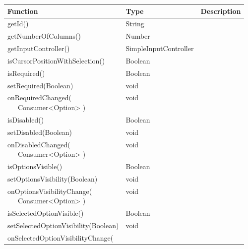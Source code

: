 \begin{table}[!htb] 
    \label{api:selectControllerReturn}
    \footnotesize
    \setlength\extrarowheight{4pt}
    \begin{tabular}{ p{5cm} p{3cm} p{5cm} }
        \toprule[1.2pt]
        \textbf{Function}                    & \textbf{Type}          & \textbf{Description} \\
        \midrule
        getId()                              & String                 &  \\
        getNumberOfColumns()                 & Number                 &  \\
        getInputController()                 & SimpleInputController  &  \\
        isCursorPositionWithSelection()      & Boolean                &  \\
        isRequired()                         & Boolean                &  \\
        setRequired(Boolean)                 & void                   &  \\
        \tbbr{
            onRequiredChanged( \\
                \ \ \ Consumer<Option>
            )}                               & void                   &  \\
        isDisabled()                         & Boolean                &  \\
        setDisabled(Boolean)                 & void                   &  \\
        \tbbr{
            onDisabledChanged( \\
                \ \ \ Consumer<Option>
            )}                               & void                   &  \\
        isOptionsVisible()                   & Boolean                &  \\
        setOptionsVisibility(Boolean)        & void                   &  \\
        \tbbr{
            onOptionsVisibilityChange( \\
                \ \ \ Consumer<Option>
            )}                               & void                   &  \\
        isSelectedOptionVisible()            & Boolean                &  \\
        setSelectedOptionVisibility(Boolean) & void                   &  \\
        \tbbr{
            onSelectedOptionVisibilityChange( \\
}
\end{tabular}
\end{table}
